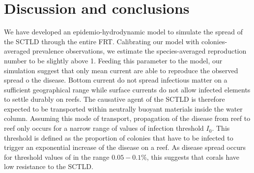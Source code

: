 \documentclass[utf8]{frontiersSCNS}
\begin{document}

\section{Discussion and conclusions}


We have developed an epidemio-hydrodynamic model to simulate the spread of the SCTLD through the entire FRT. Calibrating our model with colonies-averaged prevalence observations, we estimate the species-averaged reproduction number to be slightly above 1. Feeding this parameter to the model, our simulation suggest that only mean current are able to reproduce the observed spread o the disease. Bottom current do not spread infectious matter on a sufficient geographical range while surface currents do not allow infected elements to settle durably on reefs. The causative agent of the SCTLD is therefore expected to be transported within neutrally buoyant materials inside the water column. Assuming this mode of transport, propagation of the disease from reef to reef only occurs for a narrow range of values of infection threshold $I_0$. This threshold is defined as the proportion of colonies that have to be infected to trigger an exponential increase of the disease on a reef. As disease spread occurs for threshold values of in the range $0.05-0.1\%$, this suggests that corals have low resistance to the SCTLD.

\end{document}
